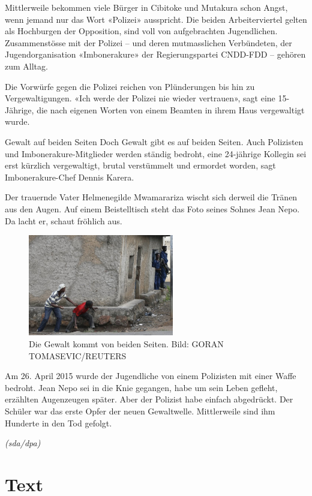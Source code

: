 \documentclass{article}
\begin{document}
	Mittlerweile bekommen viele Bürger in Cibitoke und Mutakura schon Angst, wenn jemand nur das Wort «Polizei» ausspricht. Die beiden Arbeiterviertel gelten als Hochburgen der Opposition, sind voll von aufgebrachten Jugendlichen. Zusammenstösse mit der Polizei – und deren mutmasslichen Verbündeten, der Jugendorganisation «Imbonerakure» der Regierungspartei CNDD-FDD – gehören zum Alltag.
	
	Die Vorwürfe gegen die Polizei reichen von Plünderungen bis hin zu Vergewaltigungen. «Ich werde der Polizei nie wieder vertrauen», sagt eine 15-Jährige, die nach eigenen Worten von einem Beamten in ihrem Haus vergewaltigt wurde.
	
	Gewalt auf beiden Seiten
	Doch Gewalt gibt es auf beiden Seiten. Auch Polizisten und Imbonerakure-Mitglieder werden ständig bedroht, eine 24-jährige Kollegin sei erst kürzlich vergewaltigt, brutal verstümmelt und ermordet worden, sagt Imbonerakure-Chef Dennis Karera.
	
	Der trauernde Vater Helmenegilde Mwamarariza wischt sich derweil die Tränen aus den Augen. Auf einem Beistelltisch steht das Foto seines Sohnes Jean Nepo. Da lacht er, schaut fröhlich aus.
	
	\begin{figure}
		  \centering
		\includegraphics[width=180pt]{img/img5}
		\caption{Die Gewalt kommt von beiden Seiten. Bild: GORAN TOMASEVIC/REUTERS}
	\end{figure}
	
	Am 26. April 2015 wurde der Jugendliche von einem Polizisten mit einer Waffe bedroht. Jean Nepo sei in die Knie gegangen, habe um sein Leben gefleht, erzählten Augenzeugen später. Aber der Polizist habe einfach abgedrückt. Der Schüler war das erste Opfer der neuen Gewaltwelle. Mittlerweile sind ihm Hunderte in den Tod gefolgt. 
	
	\textit{(sda/dpa)}
	
	\clearpage
	
	\section{Text}
\end{document}
